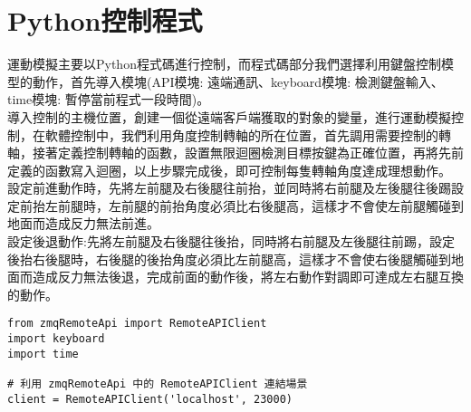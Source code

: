 \section{Python控制程式}
運動模擬主要以Python程式碼進行控制，而程式碼部分我們選擇利用鍵盤控制模型的動作，首先導入模塊(API模塊: 遠端通訊、keyboard模塊: 檢測鍵盤輸入、time模塊: 暫停當前程式一段時間)。\\
導入控制的主機位置，創建一個從遠端客戶端獲取的對象的變量，進行運動模擬控制，在軟體控制中，我們利用角度控制轉軸的所在位置，首先調用需要控制的轉軸，接著定義控制轉軸的函數，設置無限迴圈檢測目標按鍵為正確位置，再將先前定義的函數寫入迴圈，以上步驟完成後，即可控制每隻轉軸角度達成理想動作。\\
設定前進動作時，先將左前腿及右後腿往前抬，並同時將右前腿及左後腿往後踢設定前抬左前腿時，左前腿的前抬角度必須比右後腿高，這樣才不會使左前腿觸碰到地面而造成反力無法前進。\\
設定後退動作:先將左前腿及右後腿往後抬，同時將右前腿及左後腿往前踢，設定後抬右後腿時，右後腿的後抬角度必須比左前腿高，這樣才不會使右後腿觸碰到地面而造成反力無法後退，完成前面的動作後，將左右動作對調即可達成左右腿互換的動作。\\

\begin{lstlisting}
from zmqRemoteApi import RemoteAPIClient
import keyboard
import time

# 利用 zmqRemoteApi 中的 RemoteAPIClient 連結場景
client = RemoteAPIClient('localhost', 23000)
\end{lstlisting}

